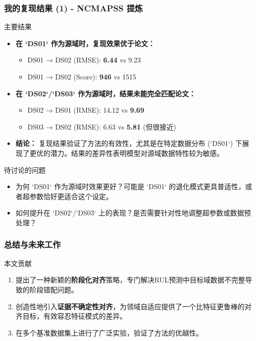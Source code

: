\documentclass{beamer}
\begin{document}
\begin{frame}
    \frametitle{我的复现结果 (1) - NCMAPSS 提炼}
    \begin{block}{主要结果}
        \begin{itemize}
            \item \textbf{在 `DS01` 作为源域时，复现效果优于论文：}
                \begin{itemize}
                    \item DS01 → DS02 (RMSE): \textbf{6.44} vs 9.23
                    \item DS01 → DS02 (Score): \textbf{946} vs 1515
                \end{itemize}
            \item \textbf{在 `DS02`/`DS03` 作为源域时，结果未能完全匹配论文：}
                 \begin{itemize}
                    \item DS02 → DS01 (RMSE): 14.12 vs \textbf{9.69}
                    \item DS03 → DS02 (RMSE): 6.63 vs \textbf{5.81} (但很接近)
                 \end{itemize}
            \item \textbf{结论：} 复现结果验证了方法的有效性，尤其是在特定数据分布 (`DS01`) 下展现了更优的潜力。结果的差异性表明模型对源域数据特性较为敏感。
        \end{itemize}
    \end{block}
    \begin{block}{待讨论的问题}
        \begin{itemize}
            \item 为何 `DS01` 作为源域时效果更好？可能是 `DS01` 的退化模式更具普适性，或者超参数恰好更适合这个设定。
            \item 如何提升在 `DS02`/`DS03` 上的表现？是否需要针对性地调整超参数或数据预处理？
        \end{itemize}
    \end{block}
\end{frame}



\begin{frame}
    \frametitle{总结与未来工作}
    \begin{block}{本文贡献}
        \begin{enumerate}
            \item 提出了一种新颖的\textbf{阶段化对齐}策略，专门解决RUL预测中目标域数据不完整导致的阶段错配问题。
            \item 创造性地引入\textbf{证据不确定性对齐}，为领域自适应提供了一个比特征更鲁棒的对齐目标，有效容忍特征模式的差异。
            \item 在多个基准数据集上进行了广泛实验，验证了方法的优越性。
        \end{enumerate}
    \end{block}
\end{frame}
\end{document}
